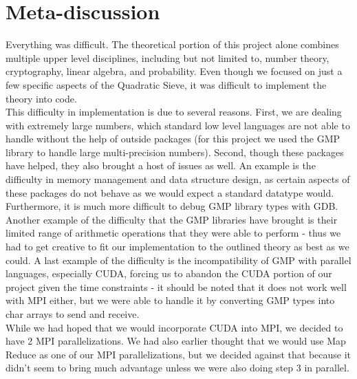 \documentclass[11pt,twocolumn]{article}
\begin{document}
\section{Meta-discussion}\label{meta}
Everything was difficult. The theoretical portion of this project alone combines multiple upper level disciplines, including but not limited to, number theory, cryptography, linear algebra, and probability. Even though we focused on just a few specific aspects of the Quadratic Sieve, it was difficult to implement the theory into code.\\
\indent This difficulty in implementation is due to several reasons. First, we are dealing with extremely large numbers, which standard low level languages are not able to handle without the help of outside packages (for this project we used the GMP library to handle large multi-precision numbers). Second, though these packages have helped, they also brought a host of issues as well. An example is the difficulty in memory management and data structure design, as certain aspects of these packages do not behave as we would expect a standard datatype would. Furthermore, it is much more difficult to debug GMP library types with GDB. Another example of the difficulty that the GMP libraries have brought is their limited range of arithmetic operations that they were able to perform - thus we had to get creative to fit our implementation to the outlined theory as best as we could. A last example of the difficulty is the incompatibility of GMP with parallel languages, especially CUDA, forcing us to abandon the CUDA portion of our project given the time constraints - it should be noted that it does not work well with MPI either, but we were able to handle it by converting GMP types into char arrays to send and receive. \\
\indent While we had hoped that we would incorporate CUDA into MPI, we decided to have 2 MPI parallelizations. We had also earlier thought that we would use Map Reduce as one of our MPI parallelizations, but we decided against that because it didn't seem to bring much advantage unless we were also doing step 3 in parallel.







\end{document}
